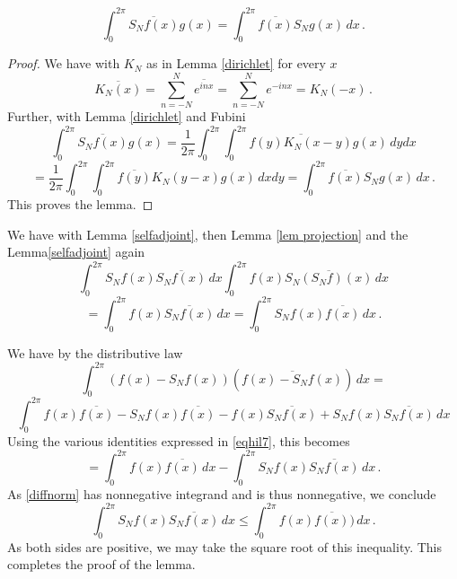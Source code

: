 {\begin{lemma}
\begin{equation}
       \int_0^{2\pi} \overline{S_Nf(x)} g(x)=\int_0^{2\pi} \overline{f(x)} S_Ng(x)\, dx\, .
    \end{equation}
\end{lemma}
\begin{proof}
  We have with $K_N$ as in Lemma \ref{dirichlet} for every $x$
  \begin{equation}
      \overline{K_N(x)}=\sum_{n=-N}^N\overline{ e^{in x}}=
      {\sum_{n=-N}^N e^{-in x}}=K_N(-x)\, .
  \end{equation}
 Further, with Lemma \ref{dirichlet} and Fubini
\begin{equation*}
\int_0^{2\pi} \overline{S_Nf(x)} g(x)
= \frac 1{2\pi} \int_0^{2\pi} \int_{0}^{2\pi}\overline{f(y) K_N(x-y)} g(x)\, dy dx
 \end{equation*}
 \begin{equation}
=
\frac 1{2\pi} \int_0^{2\pi} \int_{0}^{2\pi}\overline{f(y)} K_N(y-x)
g(x)\, dx dy
=\int_0^{2\pi} \overline{f(x)} S_Ng(x)\, dx
\, .
\end{equation}
 This proves the lemma.
\end{proof}



We have with Lemma \ref{selfadjoint}, then Lemma \ref{lem projection} and the Lemma\ref{selfadjoint} again
\begin{equation*}
 \int_0^{2\pi}  S_Nf(x)\overline{S_Nf(x)}\, dx
 \int_0^{2\pi}  f(x)\overline{S_N(S_Nf)(x)}\, dx
\end{equation*}
\begin{equation}\label{eqhil7}
 =\int_0^{2\pi}  f(x)\overline{S_Nf(x)}\, dx=
 \int_0^{2\pi}  S_N f(x)\overline{f(x)}\, dx\, .
\end{equation}

We have by the distributive law
\begin{equation}\label{diffnorm}
    \int_0^{2\pi} (f(x)-S_Nf(x))(\overline{f(x)-S_Nf(x)})\, dx=
\end{equation}
\begin{equation*}
 \int_0^{2\pi} f(x)\overline{f(x)}
    -S_Nf(x)\overline{f(x)}
   -f(x)\overline{S_Nf(x)}
     + S_Nf(x)\overline{S_Nf(x)}\, dx
\end{equation*}
Using the various identities expressed in \eqref{eqhil7}, this becomes
\begin{equation}
 =\int_0^{2\pi} f(x)\overline{f(x)}\, dx
    -
   \int_0^{2\pi} S_Nf(x)\overline{S_Nf(x)}\, dx\, .
\end{equation}
As \eqref{diffnorm} has nonnegative integrand and is thus nonnegative, we conclude
\begin{equation}
  \int_0^{2\pi} S_Nf(x)\overline{S_Nf(x)}\, dx\le
 \int_0^{2\pi} f(x)\overline{f(x)})\, dx\, .
\end{equation}
As both sides are positive, we may take the square root of this inequality.
This completes the proof of the lemma.














}

